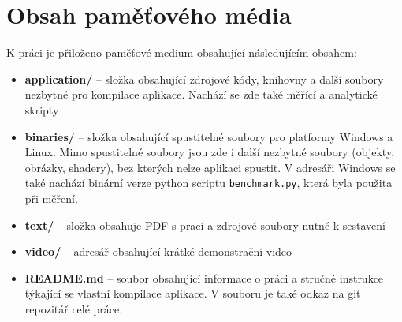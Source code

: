 \chapter{Obsah paměťového média}
K práci je přiloženo paměťové medium obsahující následujícím obsahem:
\begin{itemize}
    \item \textbf{application/} -- složka obsahující zdrojové kódy, knihovny a další soubory nezbytné pro kompilace aplikace. Nachází se zde také měřící a analytické skripty
    \item \textbf{binaries/} -- složka obsahující spustitelné soubory pro platformy Windows a Linux. Mimo spustitelné soubory jsou zde i další nezbytné soubory (objekty, obrázky, shadery), bez kterých nelze aplikaci spustit. V adresáři Windows se také nachází binární verze python scriptu \texttt{benchmark.py}, která byla použita při měření. 
    \item \textbf{text/} -- složka obsahuje PDF s prací a zdrojové soubory nutné k sestavení
    \item \textbf{video/} -- adresář obsahující krátké demonstrační video 
    \item \textbf{README.md} -- soubor obsahující informace o práci a stručné instrukce týkající se vlastní kompilace aplikace. V souboru je také odkaz na git repozitář celé práce.
\end{itemize}